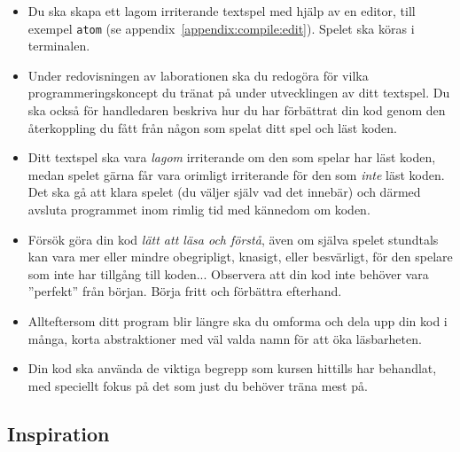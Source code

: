 \begin{itemize}
\item Du ska skapa ett lagom irriterande textspel med hjälp av en editor, till exempel \texttt{atom} (se appendix~\ref{appendix:compile:edit}). Spelet ska köras i terminalen.

\item Under redovisningen av laborationen ska du redogöra för vilka programmeringskoncept du tränat på under utvecklingen av ditt textspel. Du ska också för handledaren beskriva hur du har förbättrat din kod genom den återkoppling du fått från någon som spelat ditt spel och läst koden.

\item Ditt textspel ska vara \emph{lagom} irriterande om den som spelar har läst koden, medan spelet gärna får vara orimligt irriterande för den som \emph{inte} läst koden. Det ska gå att klara spelet (du väljer själv vad det innebär) och därmed avsluta programmet inom rimlig tid med kännedom om koden.

\item Försök göra din kod \textit{lätt att läsa och förstå}, även om själva spelet stundtals kan vara mer eller mindre obegripligt, knasigt, eller besvärligt, för den spelare som inte har tillgång till koden... Observera att din kod inte behöver vara ''perfekt'' från början. Börja fritt och förbättra efterhand.

\item Allteftersom ditt program blir längre ska du omforma och dela upp din kod i många, korta abstraktioner med väl valda namn för att öka läsbarheten.

\item Din kod ska använda de viktiga begrepp som kursen hittills har behandlat, med speciellt fokus på det som just du behöver träna mest på.

\end{itemize}

\subsection{Inspiration}

